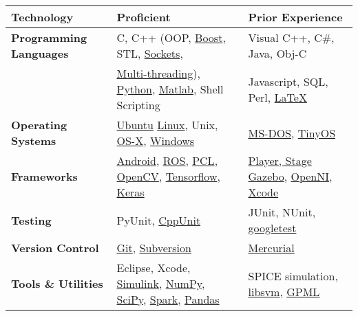 \begin{table*}[h]
    \begin{tabular}{|lll|}
        \hline \bfseries Technology & \bfseries Proficient & \bfseries Prior Experience \\\hline 
        \hline \bfseries Programming Languages & C, C++ (OOP, \href{http://boost.org}{Boost}, STL, \href{http://beej.us/guide/bgnet/output/html/multipage/index.html}{Sockets},  & Visual C++, C\#, Java, Obj-C  \\
        & \href{https://computing.llnl.gov/tutorials/pthreads/}{Multi-threading}), \href{http://www.greenteapress.com/thinkpython/html/index.html}{Python}, \href{http://www.mathworks.com/}{Matlab}, Shell Scripting &  Javascript, SQL, Perl, \href{http://www.latex-project.org/}{\LaTeX} \\
        \hline \bfseries Operating Systems & \href{http://www.ubuntu.com/}{Ubuntu} \href{http://www.linux.org/}{Linux}, Unix, \href{https://developer.apple.com/}{OS-X}, \href{http://windows.microsoft.com/en-us/windows/home}{Windows} & \href{http://en.wikipedia.org/wiki/DOS}{MS-DOS}, \href{http://www.tinyos.net/}{TinyOS}  \\
        \hline \bfseries Frameworks & \href{http://developer.android.com/index.html}{Android}, \href{http://www.ros.org/wiki/}{ROS}, \href{http://pointclouds.org/}{PCL}, \href{http://opencv.org/}{OpenCV}, \href{https://www.tensorflow.org/}{Tensorflow}, \href{https://keras.io/}{Keras} &  \href{http://playerstage.sourceforge.net/} {Player, Stage} \href{http://gazebosim.org/}{Gazebo}, \href{http://www.openni.org/}{OpenNI}, \href{https://developer.apple.com/devcenter/ios/index.action}{Xcode}  \\
        \hline \bfseries Testing & PyUnit, \href{http://robotics.usc.edu/~ampereir/wordpress/?p=772}{CppUnit} & JUnit, NUnit, \href{https://code.google.com/p/googletest/}{googletest} \\
        \hline \bfseries Version Control & \href{http://robotics.usc.edu/~ampereir/wordpress/?p=487}{Git}, \href{http://subversion.apache.org/}{Subversion} &  \href{http://mercurial.selenic.com/}{Mercurial} \\
        \hline \bfseries Tools \& Utilities & Eclipse, Xcode, \href{http://www.mathworks.com/products/simulink/}{Simulink}, \href{http://www.numpy.org/}{NumPy}, \href{http://www.scipy.org/}{SciPy}, \href{https://spark.apache.org/}{Spark}, \href{https://pandas.pydata.org/}{Pandas} & SPICE simulation, \href{http://www.csie.ntu.edu.tw/~cjlin/libsvm/}{libsvm}, \href{http://www.gaussianprocess.org/gpml/code/matlab/doc/}{GPML} \\

\end{tabular}
\end{table*}
